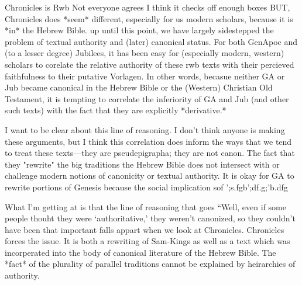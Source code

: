

Chronicles is Rwb
    Not everyone agrees
    I think it checks off enough boxes
BUT, Chronicles does *seem* different, especially for us modern scholars, because it is *in* the Hebrew Bible. up until this point, we have largely sidestepped the problem of textual authority and (later) canonical status. For both GenApoc and (to a lesser degree) Jubilees, it has been easy for (especially modern, western) scholars to corelate the relative authority of these rwb texts with their percieved faithfulness to their putative Vorlagen. In other words, becasue neither GA or Jub became canonical in the Hebrew Bible or the (Western) Christian Old Testament, it is tempting to correlate the inferiority of GA and Jub (and other such texts) with the fact that they are explicitly *derivative.* 

I want to be clear about this line of reasoning. I don't think anyone is making these arguments, but I think this correlation does inform the ways that we tend to treat these texts---they are pseudepigrapha; they are not canon. The fact that they "rewrite" the big traditions the Hebrew Bible does not intersect with or challenge modern notions of canonicity or textual authority. It is okay for GA to rewrite portions of Genesis because the social implication sof ';s.fgb';df.g;'b.dfg

What I'm getting at is that the line of reasoning that goes ``Well, even if some people thouht they were `authoritative,' they weren't canonized, so they couldn't have been that important falls appart when we look at Chronicles. Chronicles forces the issue. It is both a rewriting of Sam-Kings as well as a text which was incorperated into the body of canonical literature of the Hebrew Bible. The *fact* of the plurality of parallel traditions cannot be explained by heirarchies of authority.